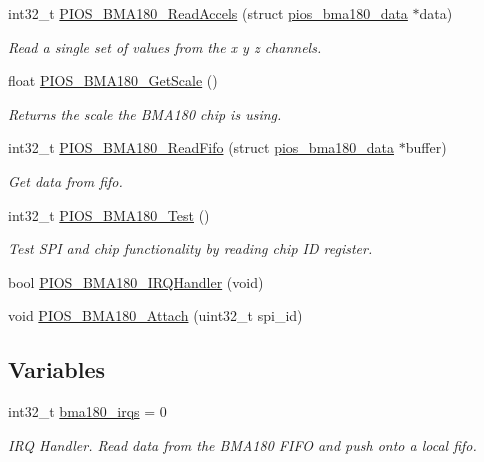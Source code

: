 \begin{DoxyCompactItemize}
int32\-\_\-t \hyperlink{group___p_i_o_s___b_m_a180_ga7b56742fa09a8cb81b620c4ddb35e0a0}{\-P\-I\-O\-S\-\_\-\-B\-M\-A180\-\_\-\-Read\-Accels} (struct \hyperlink{structpios__bma180__data}{pios\-\_\-bma180\-\_\-data} $\ast$data)
\begin{DoxyCompactList}\small\item\em \-Read a single set of values from the x y z channels. \end{DoxyCompactList}\item 
float \hyperlink{group___p_i_o_s___b_m_a180_gac0b0ac69b4fecb73c72a5acf917471b4}{\-P\-I\-O\-S\-\_\-\-B\-M\-A180\-\_\-\-Get\-Scale} ()
\begin{DoxyCompactList}\small\item\em \-Returns the scale the \-B\-M\-A180 chip is using. \end{DoxyCompactList}\item 
int32\-\_\-t \hyperlink{group___p_i_o_s___b_m_a180_gaae90c39f1345aa38815791270aca39ae}{\-P\-I\-O\-S\-\_\-\-B\-M\-A180\-\_\-\-Read\-Fifo} (struct \hyperlink{structpios__bma180__data}{pios\-\_\-bma180\-\_\-data} $\ast$buffer)
\begin{DoxyCompactList}\small\item\em \-Get data from fifo. \end{DoxyCompactList}\item 
int32\-\_\-t \hyperlink{group___p_i_o_s___b_m_a180_ga581d274e0f804ba0c8ef0406a782aa8d}{\-P\-I\-O\-S\-\_\-\-B\-M\-A180\-\_\-\-Test} ()
\begin{DoxyCompactList}\small\item\em \-Test \-S\-P\-I and chip functionality by reading chip \-I\-D register. \end{DoxyCompactList}\item 
bool \hyperlink{group___p_i_o_s___b_m_a180_gaded704c5b366fadaac4efb9272a9414a}{\-P\-I\-O\-S\-\_\-\-B\-M\-A180\-\_\-\-I\-R\-Q\-Handler} (void)
\item 
void \hyperlink{group___p_i_o_s___b_m_a180_ga7630f96fe8305335e0f834bd7e594007}{\-P\-I\-O\-S\-\_\-\-B\-M\-A180\-\_\-\-Attach} (uint32\-\_\-t spi\-\_\-id)
\end{DoxyCompactItemize}
\subsection*{\-Variables}
\begin{DoxyCompactItemize}
\item 
int32\-\_\-t \hyperlink{group___p_i_o_s___b_m_a180_gabbaf3c8a871b2c19d493446ad684c3dc}{bma180\-\_\-irqs} = 0
\begin{DoxyCompactList}\small\item\em \-I\-R\-Q \-Handler. \-Read data from the \-B\-M\-A180 \-F\-I\-F\-O and push onto a local fifo. \end{DoxyCompactList}\end{DoxyCompactItemize}


